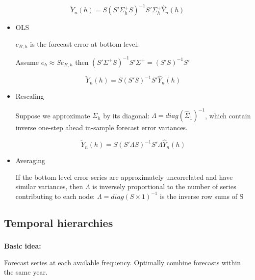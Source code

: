 \documentclass[c, dvipsnames]{beamer}  %
\begin{document}
\begin{frame}[shrink=5]
\frametitle{\insertsection} 
\framesubtitle{\insertsubsection}


\[ \tilde{Y}_n ( h )
= 
 S ( S' \Sigma^{+}_h S )^{-1}  S'  \Sigma^{+}_h  \hat{Y}_n ( h )
\]


\begin{itemize}
	\item OLS
	
 	 $ e_{B , h} $ is the forecast
	error at bottom level.
	
	Assume $ e_h \approx S e_{B , h} $ 	
	then $ ( S' \Sigma^{+}  S )^{-1} S'  \Sigma^{+} = ( S'S )^{ - 1} S'  $
	
	
\[  \tilde{Y}_n ( h )
 =  S ( S'  S )^{-1}  S'   \hat{Y}_n ( h )
 \]	
	
	
	\item Rescaling
	
	Suppose we approximate $ \Sigma_h $ by its diagonal: 
$ \Lambda = diag(\hat{\Sigma}_1)^{-1}
 $,  which	
 contain inverse
	one-step ahead in-sample forecast error
	variances.
	
	\[ \tilde{Y}_n ( h )
	=  S ( S'  \Lambda S )^{-1}  S'   \Lambda  \hat{Y}_n ( h )
	\]
	
	\item Averaging
	
	If the bottom level error series are
	approximately uncorrelated and have similar
	variances, then $ \Lambda $ is inversely proportional to
	the number of series contributing to each
	node: 
	$ \Lambda = diag( S \times 1 )^{- 1}
 $ is  the inverse row sums of S
 
\end{itemize}




\end{frame}




\subsection{Temporal hierarchies}



\begin{frame}[shrink=5]
\frametitle{\insertsection} 
\framesubtitle{\insertsubsection}


\textbf{Basic idea:}

Forecast series at each available
frequency. Optimally combine forecasts within the
same year.


\end{frame}
\end{document}
